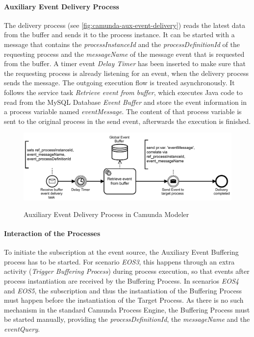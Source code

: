\paragraph{Auxiliary Event Delivery Process}
The delivery process (see \autoref{fig:camunda-aux-event-delivery}) reads the latest data from the buffer and sends it to the process instance. It can be started with a message that contains the \textit{processInstanceId} and the \textit{processDefinitionId} of the requesting process and the \textit{messageName} of the message event that is requested from the buffer.
A timer event \textit{Delay Timer} has been inserted to make sure that the requesting process is already listening for an event, when the delivery process sends the message. The outgoing execution flow is treated asynchronously.
It follows the service task \textit{Retrieve event from buffer}, which executes Java code to read from the MySQL Database \textit{Event Buffer} and store the event information in a process variable named \textit{eventMessage}.
The content of that process variable is sent to the original process in the send event, afterwards the execution is finished.

\begin{figure}[]
	\myfloatalign
	{\includegraphics[width=1\linewidth]{chapters/assessment/buffer-delivery-process.PNG}}
	\caption{Auxiliary Event Delivery Process in Camunda Modeler}\label{fig:camunda-aux-event-delivery}
\end{figure}


\paragraph{Interaction of the Processes}
To initiate the subscription at the event source, the Auxiliary Event Buffering process has to be started.
For scenario \textit{EOS3}, this happens through an extra activity (\textit{Trigger Buffering Process}) during process execution, so that events after process instantiation are received by the Buffering Process.
In scenarios \textit{EOS4} and \textit{EOS5}, the subscription and thus the instantiation of the Buffering Process must happen before the instantiation of the Target Process. As there is no such mechanism in the standard Camunda Process Engine, the Buffering Process must be started manually, providing the \textit{processDefinitionId}, the \textit{messageName} and the \textit{eventQuery}.


